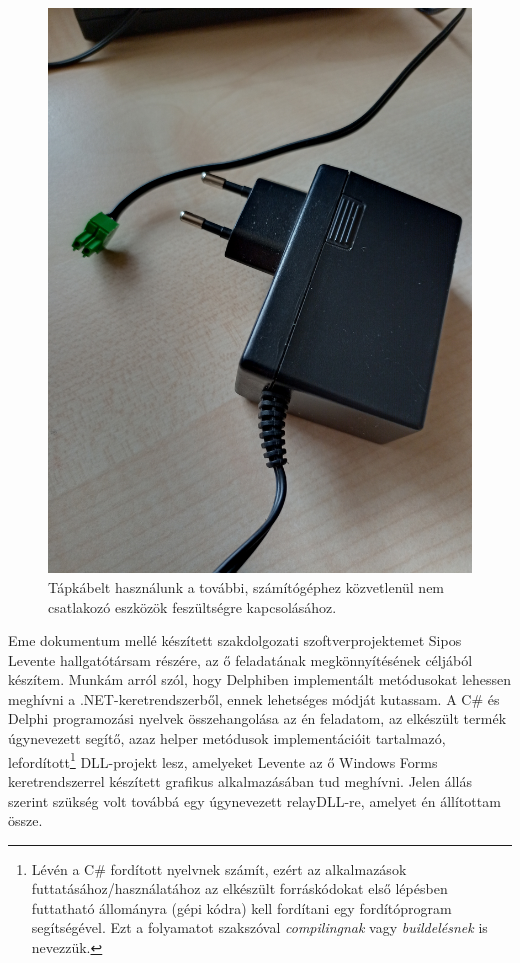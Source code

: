 \documentclass[tocnopagenum]{thesis-ekf}
\theoremstyle{definition}
\theoremstyle{remark}
\begin{document}
	\begin{figure}[h!]
		\centering
		\includegraphics[scale=0.075]{images/foto_tapkabel.jpg}
		\caption{Tápkábelt használunk a további, számítógéphez közvetlenül nem csatlakozó eszközök feszültségre kapcsolásához.}
		\label{fig:foto_tapkabel}
	\end{figure}	
	
	Eme dokumentum mellé készített szakdolgozati szoftverprojektemet Sipos Levente hallgatótársam részére, az ő feladatának megkönnyítésének céljából készítem. 
	Munkám arról szól, hogy Delphiben implementált metódusokat lehessen meghívni a .NET-keretrendszerből, ennek lehetséges módját kutassam. A C\# és Delphi programozási nyelvek összehangolása az én feladatom, az elkészült termék úgynevezett segítő, azaz helper metódusok implementációit tartalmazó, lefordított\footnote{Lévén a C\# fordított nyelvnek számít, ezért az alkalmazások futtatásához/használatához az elkészült forráskódokat első lépésben futtatható állományra (gépi kódra) kell fordítani egy fordítóprogram segítségével. Ezt a folyamatot szakszóval \textit{compilingnak} vagy \textit{buildelésnek} is nevezzük.} DLL-projekt lesz, amelyeket Levente az ő Windows Forms keretrendszerrel készített grafikus alkalmazásában tud meghívni. Jelen állás szerint szükség volt továbbá egy úgynevezett relayDLL-re, amelyet én állítottam össze.
	
\end{document}
